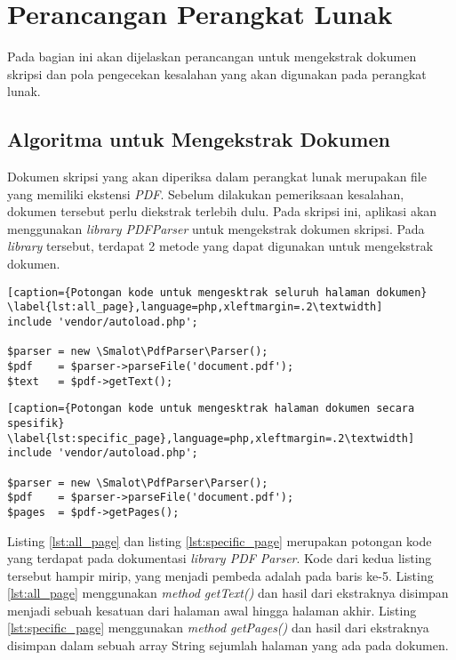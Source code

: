 \section{Perancangan Perangkat Lunak}
Pada bagian ini akan dijelaskan perancangan untuk mengekstrak dokumen skripsi dan pola pengecekan kesalahan yang akan digunakan pada perangkat lunak.
 
\subsection{Algoritma untuk Mengekstrak Dokumen}
Dokumen skripsi yang akan diperiksa dalam perangkat lunak merupakan file yang memiliki ekstensi \textit{PDF}. Sebelum dilakukan pemeriksaan kesalahan, dokumen tersebut perlu diekstrak terlebih dulu. Pada skripsi ini, aplikasi akan menggunakan \textit{library PDFParser} untuk mengekstrak dokumen skripsi. Pada \textit{library} tersebut, terdapat 2 metode yang dapat digunakan untuk mengekstrak dokumen.
	
\begin{lstlisting}[caption={Potongan kode untuk mengesktrak seluruh halaman dokumen}	\label{lst:all_page},language=php,xleftmargin=.2\textwidth] 
include 'vendor/autoload.php';
	
$parser = new \Smalot\PdfParser\Parser();
$pdf    = $parser->parseFile('document.pdf');
$text   = $pdf->getText();
\end{lstlisting}
	
\begin{lstlisting}[caption={Potongan kode untuk mengesktrak halaman dokumen secara spesifik}
\label{lst:specific_page},language=php,xleftmargin=.2\textwidth] 
include 'vendor/autoload.php';

$parser = new \Smalot\PdfParser\Parser();
$pdf    = $parser->parseFile('document.pdf');
$pages  = $pdf->getPages();
\end{lstlisting}
\medskip

Listing \ref{lst:all_page} dan listing \ref{lst:specific_page} merupakan potongan kode yang terdapat pada dokumentasi \textit{library PDF Parser}. Kode dari kedua listing tersebut hampir mirip, yang menjadi pembeda adalah pada baris ke-5. Listing \ref{lst:all_page} menggunakan \textit{method getText()} dan hasil dari ekstraknya disimpan menjadi sebuah kesatuan dari halaman awal hingga halaman akhir. Listing \ref{lst:specific_page} menggunakan \textit{method getPages()} dan hasil dari ekstraknya disimpan dalam sebuah array String sejumlah halaman yang ada pada dokumen.

